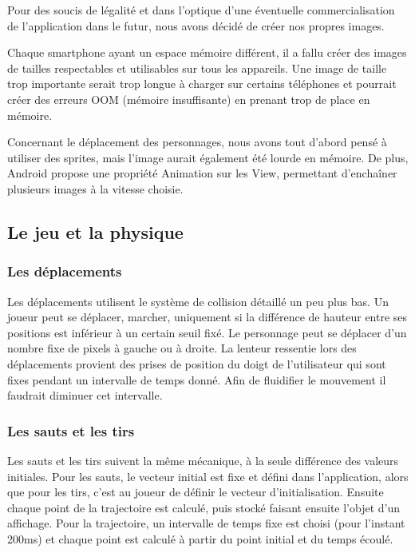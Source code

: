 \documentclass{report}
\begin{document}
Pour des soucis de légalité et dans l’optique d’une éventuelle commercialisation de l’application dans le futur, nous avons décidé de créer nos propres images.

Chaque smartphone ayant un espace mémoire différent, il a fallu créer des images de tailles respectables et utilisables sur tous les appareils. Une image de taille trop importante serait trop longue à charger sur certains téléphones et pourrait créer des erreurs OOM (mémoire insuffisante) en prenant trop de place en mémoire.

Concernant le déplacement des personnages, nous avons tout d’abord pensé à utiliser des sprites, mais l’image aurait également été lourde en mémoire. De plus, Android propose une propriété Animation sur les View, permettant d'enchaîner plusieurs images à la vitesse choisie.

\subsection{Le jeu et la physique}

\subsubsection{Les déplacements}

Les déplacements utilisent le système de collision détaillé un peu plus bas. Un joueur peut se déplacer, marcher, uniquement si la différence de hauteur entre ses positions est inférieur à un certain seuil fixé. Le personnage peut se déplacer d’un nombre fixe de pixels à gauche ou à droite. La lenteur ressentie lors des déplacements provient des prises de position du doigt de l’utilisateur qui sont fixes pendant un intervalle de temps donné. Afin de fluidifier le mouvement il faudrait diminuer cet intervalle.

\subsubsection{Les sauts et les tirs}
Les sauts et les tirs suivent la même mécanique, à la seule différence des valeurs initiales. Pour les sauts, le vecteur initial est fixe et défini dans l’application, alors que pour les tirs, c’est au joueur de définir le vecteur d’initialisation. Ensuite chaque point de la trajectoire est calculé, puis stocké faisant ensuite l’objet d’un affichage. Pour la trajectoire, un intervalle de temps fixe est choisi (pour l’instant 200ms) et chaque point est calculé à partir du point initial et du temps écoulé.
\end{document}

